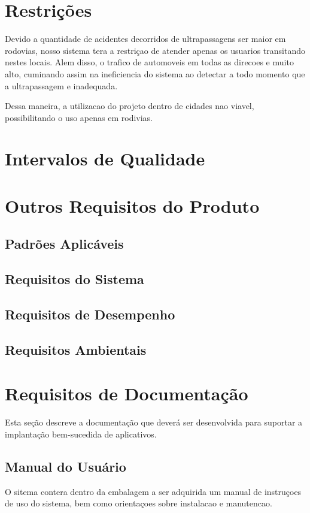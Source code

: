 \section{Restrições}
Devido a quantidade de acidentes decorridos de ultrapassagens ser maior em rodovias, nosso sistema tera a restriçao de atender apenas os usuarios transitando nestes locais. Alem disso, o trafico de automoveis em todas as direcoes e muito alto, cuminando assim na ineficiencia do sistema ao detectar a todo momento que a ultrapassagem e inadequada.

Dessa maneira, a utilizacao do projeto dentro de cidades nao viavel, possibilitando o uso apenas em rodivias.

\section{Intervalos de Qualidade}

\section{Outros Requisitos do Produto}

\subsection{Padrões Aplicáveis}

\subsection{Requisitos do Sistema}

\subsection{Requisitos de Desempenho }

\subsection{Requisitos Ambientais}

\section{Requisitos de Documentação}
Esta seção descreve a documentação que deverá ser desenvolvida para suportar a implantação bem-sucedida de aplicativos.

\subsection{Manual do Usuário}
O sitema contera dentro da embalagem a ser adquirida um manual de instruçoes de uso do sistema, bem como orientaçoes sobre instalacao e manutencao.

